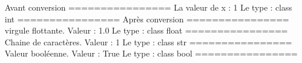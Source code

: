 \documentclass[letterpaper,10pt,french]{sphinxmanual}
\begin{document}
\begin{sphinxVerbatim}[commandchars=\\\{\}]
     
\end{sphinxVerbatim}

\begin{sphinxVerbatim}[commandchars=\\\{\}]
			Avant conversion
================
La valeur de x : 1 				Le type : \PYGZlt{}class \PYGZsq{}int\PYGZsq{}\PYGZgt{}
================
			 Après conversion
================
virgule flottante. 	Valeur : 1.0 		Le type : \PYGZlt{}class \PYGZsq{}float\PYGZsq{}\PYGZgt{}
================
Chaine de caractères. 	Valeur : 1 		Le type : \PYGZlt{}class \PYGZsq{}str\PYGZsq{}\PYGZgt{}
================
Valeur booléenne. 	Valeur : True 		Le type : \PYGZlt{}class \PYGZsq{}bool\PYGZsq{}\PYGZgt{}
================
\end{sphinxVerbatim}
\end{document}
